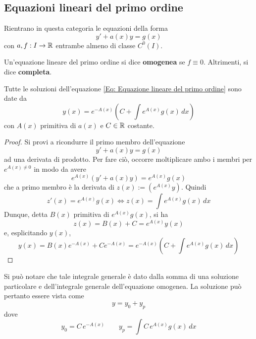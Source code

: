 \subsection{Equazioni lineari del primo ordine}
Rientrano in questa categoria le equazioni della forma
\begin{equation} \label{Eq: Equazione lineare del primo ordine}
    y'+ a(x) y = g(x)
\end{equation}
con $a,f: I \to \mathbb{R}$ entrambe almeno di classe $C^0(I)$.\\
\begin{definition}
    Un'equazione lineare del primo ordine si dice \textbf{omogenea} se $f \equiv 0$. Altrimenti, si dice \textbf{completa}.
\end{definition}
\begin{theorem} \label{Teo: Integrale generale delle ode lineare del primo ordine}
    Tutte le soluzioni dell'equazione \eqref{Eq: Equazione lineare del primo ordine} sono date da
    \begin{equation*}
        y(x)=e^{-A(x)}\left(C+ \int{e^{A(x)}g(x)}\,dx\right)
    \end{equation*}
    con $A(x)$ primitiva di $a(x)$ e $C \in \mathbb{R}$ costante.
\end{theorem}
\begin{proof} 
Si provi a ricondurre il primo membro  dell'equazione 
\begin{equation*}
    y'+ a(x) y = g(x)
\end{equation*}
ad una derivata di prodotto. Per fare ciò, occorre moltiplicare ambo i membri per $e^{A(x) \neq 0}$ in modo da avere
\begin{equation*}
    e^{A(x)}(y'+a(x)y)= e^{A(x)}g(x)
\end{equation*}
che a primo membro è la derivata di $z(x):=\left(e^{A(x)}y \right)$. Quindi
\begin{equation*}
    z'(x)= e^{A(x)}g(x) \iff z(x)=\int e^{A(x)}g(x)\,dx
\end{equation*}
Dunque, detta $B(x)$ primitiva di $e^{A(x)}g(x)$, si ha
\begin{equation*}
 z(x)= B(x)+C= e^{A(x)}y(x)
 \end{equation*}
 e, esplicitando $y(x)$,
 \begin{equation*}
    y(x)= B(x) e^{-A(x)} + C{e^{-A(x)}} = e^{-A(x)}\left( C + \int e^{A(x)}g(x)\,dx \right)
 \end{equation*}
\end{proof}
\begin{oss}    
Si può notare che tale integrale generale è dato dalla somma di una soluzione particolare e dell'integrale generale dell'equazione omogenea. La soluzione può pertanto essere vista come
\begin{equation*}
    y=y_0+ y_p
\end{equation*}
dove
\begin{equation*}
    y_0= C\, e^{-A(x)} \qquad y_p= \int C\, e^{A(x)}g(x)\,dx
\end{equation*}
\end{oss}

